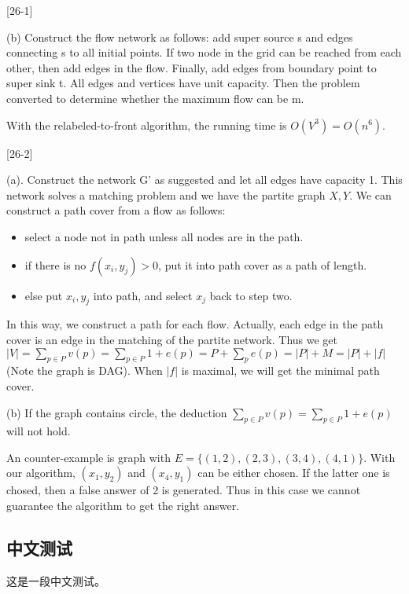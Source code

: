 \documentclass[language=english]{njurepo}
\begin{document}
 [26-1]
 
  

    (b) Construct the flow network as follows: add super source s and edges connecting s to all initial points. If two node in the grid can be reached from each other, then add edges in the flow. Finally, add edges from boundary point to super sink t. All edges and vertices have unit capacity. Then the problem converted to determine whether the maximum flow can be m.
    
    With the relabeled-to-front algorithm, the running time is $O(V^3)=O(n^6)$.
  

 [26-2]
 
  
    (a). Construct the network G' as suggested and let all edges have capacity 1. This network solves a matching problem and we have the partite graph $X,Y$. We can construct a path cover from a flow as follows:
    \begin{itemize}
        \item select a node not in path unless all nodes are in the path.
        \item if there is no $f(x_i,y_j)>0$, put it into path cover as a path of length.
        \item else put $x_i,y_j$ into path, and select $x_j$ back to step two.
    \end{itemize}

    In this way, we construct a path for each flow. Actually, each edge in the path cover is an edge in the matching of the partite network. Thus we get $|V|=\sum_{p\in P}{v(p)}=\sum_{p\in P}{1+e(p)}=P+\sum_{p}{e(p)}=|P|+M=|P|+|f|$(Note the graph is DAG). When $|f|$ is maximal, we will get the minimal path cover.

    (b) If the graph contains circle, the deduction $\sum_{p\in P}{v(p)}=\sum_{p\in P}{1+e(p)}$ will not hold.
    
    An counter-example is graph with $E=\{(1,2),(2,3),(3,4),(4,1)\}$. With our algorithm, $(x_1,y_2)$ and $(x_4,y_1)$ can be either chosen. If the latter one is chosed, then a false answer of 2 is generated. Thus in this case we cannot guarantee the algorithm to get the right answer.

    \subsection{中文测试}
    这是一段中文测试。
  
%
%
\end{document}
